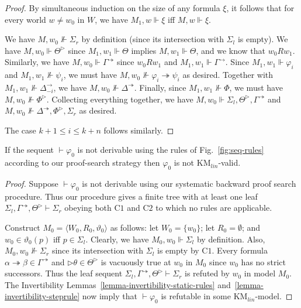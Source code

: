 \documentclass[envcountsect,envcountsame]{llncs}
\newcommand{\condone}{\mathrm{C1}}
\newcommand{\condtwo}{\mathrm{C2}}
\newcommand{\forces}{\Vdash}
\newcommand{\iimp}{\twoheadrightarrow}
\newcommand{\lcnxt}{\mathrm{KM}_{lin}}
\newcommand{\limp}{\rightarrow}
\newcommand{\nxt}{\rhd}
\newcommand{\opset}[2]{{#2}^{#1}}
\newcommand{\opsetmi}[3]{\opset{#1}{#2}_{-#3}}
\newcommand{\rel}{R}
\newcommand{\seq}{\vdash}
\begin{document}
\begin{proof}
   By simultaneous induction on the size of any formula
   $\xi$, it follows that for every world $w \neq w_0$ in $W$,
   we have
   $M_1, w \forces \xi$ iff
   $M, w \forces \xi$.

   We have
   $M, w_0 \not\forces \Sigma_r$ by definition
   (since its intersection with $\Sigma_l$ is empty).
   We have
   $M, w_0 \forces \opset{\nxt}{\Theta}$ since
   $M_1, w_1 \forces \Theta$
   implies
   $M, w_1 \forces \Theta$,
   and we know that
   $w_0 \rel w_1$.
   Similarly, we have
   $M, w_0 \forces \opset{\iimp}{\Gamma}$ since
   $w_0 \rel w_1$ and
   $M_1, w_1 \forces \opset{\limp}{\Gamma}$.
   Since
   $M_1, w_1 \forces \varphi_i$ and
   $M_1, w_1 \not\forces \psi_i$, we must have
   $M, w_0 \not\forces \varphi_i \iimp \psi_i$ as desired.
   Together with
   $M_1, w_1 \not\forces \opsetmi{\limp}{\Delta}{i}$,
   we have
   $M, w_0 \not\forces \opset{\iimp}{\Delta}$.
   Finally, since
   $M_1, w_1 \not\forces \Phi$,
   we must have
   $M, w_0 \not\forces \opset{\nxt}{\Phi}$.
Collecting everything together, we have
   $M, w_0 \forces
     \Sigma_l,
     \opset{\nxt}{\Theta},
     \opset{\iimp}{\Gamma}
   $ 
   and
   $M, w_0 \not\forces
    \opset{\iimp}{\Delta},
    \opset{\nxt}{\Phi},
    \Sigma_r
   $
   as desired.

The case $k+1 \leq i \leq k+n$ follows similarly.
\end{proof}

\begin{theorem}\label{thm:completeness}
If the sequent
  $\seq \varphi_0$
  is not derivable using the rules
of Fig.~\ref{fig:seq-rules} according to our proof-search strategy
then $\varphi_0$ is not $\lcnxt$-valid.
\end{theorem}

\begin{proof}
  Suppose $\seq \varphi_0$ is not derivable using our
  systematic backward proof search procedure. Thus our procedure gives
  a finite tree with at least one leaf
  $\Sigma_l,  \opset{\iimp}{\Gamma}, \opset{\nxt}{\Theta} \seq \Sigma_r$ 
  obeying both $\condone$ and $\condtwo$ to which no rules are applicable.


  Construct $M_0 = \langle W_0, \rel_0, \vartheta_0 \rangle$ as follows:
  let $W_0 = \{w_0\}$;
  let $\rel_0 = \emptyset$; and
  $w_0\in\vartheta_0(p)$ iff $p\in\Sigma_l$.
  Clearly, we have
  $M_0, w_0 \forces \Sigma_l$ by definition.
  Also,
  $M_0, w_0 \not\forces \Sigma_r$ since its intersection with 
  $\Sigma_l$ is empty by $\condone$. Every formula
  $\alpha\iimp\beta \in \opset{\iimp}{\Gamma}$
  and $\nxt\theta \in \opset{\nxt}{\Theta}$
 is vacuously true
  at $w_0$ in $M_0$ since $w_0$ has no strict successors.
 Thus the leaf sequent
  $\Sigma_l, \opset{\iimp}{\Gamma}, 
    \opset{\nxt}{\Theta} \seq 
   \Sigma_r
  $
  is refuted by $w_0$ in model $M_0$.
  The Invertibility Lemmas~\ref{lemma-invertibility-static-rules}
  and~\ref{lemma-invertibility-steprule} now
  imply that $\seq \varphi_0$ is 
  refutable in some $\lcnxt$-model.


\end{proof}
\end{document}
